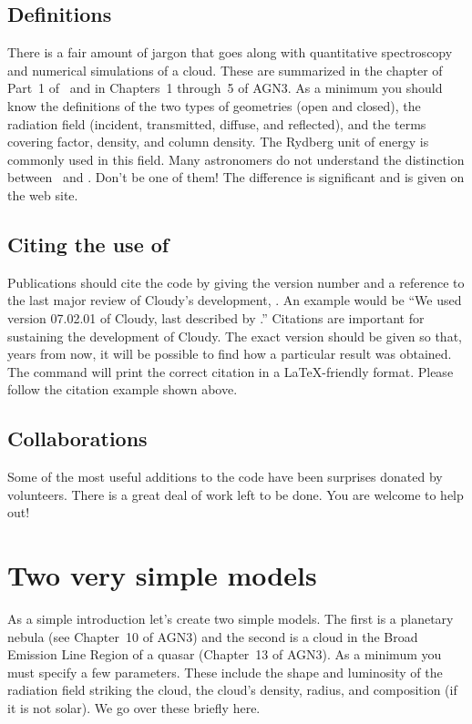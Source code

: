 \documentclass[12pt,twoside]{article}
\begin{document}
{\subsection{Definitions}

There is a fair amount of jargon that goes along with quantitative
spectroscopy and numerical simulations of a cloud.  These are summarized
in the chapter  of Part~1 of \Hazy\ and in Chapters~1 through~5
of AGN3.  As a minimum you should know the definitions of the two types of
geometries (open and closed), the radiation field (incident, transmitted, diffuse,
and reflected), and the terms covering factor, density, and column density.
The Rydberg unit of energy is commonly used in this field.
Many astronomers do not understand the distinction between
\hO\ and \hi .
Don't be one of them!  The difference is significant and is given
on the web site.

\subsection{Citing the use of \Cloudy}

Publications should cite the code by giving the version number and a
reference to the last major review of Cloudy's development,
\citet{CloudyReview}.
An example would be ``We used version 07.02.01 of Cloudy, last
described by \citet{CloudyReview}.''
Citations are important for sustaining the development of Cloudy.
The exact version should be given so that, years
from now, it will be possible to find how a particular result was obtained.
The command  will print the correct citation in a
\LaTeX-friendly format.
Please follow the citation example shown above.

\subsection{Collaborations}

Some of the most useful additions to the code have been surprises donated
by volunteers.  There is a great deal of work left to be done.  You are
welcome to help out!

\section{Two very simple models}
\label{sec:TwoVerySimpleModels}

As a simple introduction let's create two simple models.  The first is
a planetary nebula (see Chapter~10 of AGN3) and the second is a cloud in
the Broad Emission Line Region of a quasar (Chapter~13 of AGN3).  As a
minimum you must specify a few parameters.
These include the shape and luminosity of the radiation field
striking the cloud, the cloud's density, radius,
and composition (if it is not solar).
We go over these briefly here.

}
\end{document}
